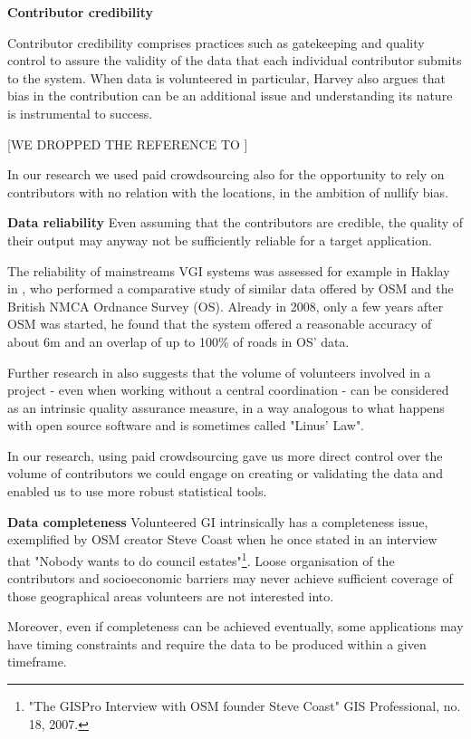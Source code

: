 \textbf{Contributor credibility} 




Contributor credibility comprises practices such as gatekeeping and quality control to assure the validity of the data that each individual contributor submits to the system. When data is volunteered in particular, Harvey \cite{Harvey:2012wsa} also argues that bias in the contribution can be an additional issue and understanding its nature is instrumental to success.

[WE DROPPED THE REFERENCE TO \cite{Flanagin:2008ck}]

In our research we used paid crowdsourcing also for the opportunity to rely on contributors with no relation with the locations, in the ambition of nullify bias.

\textbf{Data reliability} Even assuming that the contributors are credible, the quality of their output may anyway not be sufficiently reliable for a target application. 

The reliability of mainstreams VGI systems was assessed for example in Haklay in \cite{Haklay:2010vs}, who performed a comparative study of similar data offered by OSM and the British NMCA Ordnance Survey (OS). Already in 2008, only a few years after OSM was started, he found that the system offered a reasonable accuracy of about 6m and an overlap of up to 100\% of roads in OS' data. 

Further research in \cite{Haklay:2010wf} also suggests that the volume of volunteers involved in a project - even when working without a central coordination - can be considered as an intrinsic quality assurance measure, in a way analogous to what happens with open source software and is sometimes called "Linus' Law".

In our research, using paid crowdsourcing gave us more direct control over the volume of contributors we could engage on creating or validating the data and enabled us to use more robust statistical tools.

\textbf{Data completeness} Volunteered GI intrinsically has a completeness issue, exemplified by OSM creator Steve Coast when he once stated in an interview that "Nobody wants to do council estates"\footnote{"The GISPro Interview with OSM founder Steve Coast" GIS Professional, no. 18, 2007.}. Loose organisation of the contributors and socioeconomic barriers \cite{Haklay:2010vs} may never achieve sufficient coverage of those geographical areas volunteers are not interested into.

Moreover, even if completeness can be achieved eventually, some applications may have timing constraints and require the data to be produced within a given timeframe.


